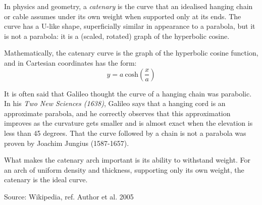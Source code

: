 \documentclass[11pt]{amsart}
\begin{document}
In physics and geometry, a \textit{catenary} is the curve that an idealised hanging chain or cable assumes under its own weight when supported only at its ends. The curve has a U-like shape, superficially similar in appearance to a parabola, but it is not a parabola: it is a (scaled, rotated) graph of the hyperbolic cosine. 

Mathematically, the catenary curve is the graph of the hyperbolic cosine function, and in Cartesian coordinates has the form:
\begin{equation}
y = a \: \mathrm{cosh}(\frac{x}{a})
\end{equation}

It is often said that Galileo thought the curve of a hanging chain was parabolic. In his \textit{Two New Sciences (1638)}, Galileo says that a hanging cord is an approximate parabola, and he correctly observes that this approximation improves as the curvature gets smaller and is almost exact when the elevation is less than 45 degrees. That the curve followed by a chain is not a parabola was proven by Joachim Jungius (1587-1657).

What makes the catenary arch important is its ability to withstand weight. For an arch of uniform density and thickness, supporting only its own weight, the catenary is the ideal curve.

Source: Wikipedia, ref. Author et al. 2005
\end{document}

